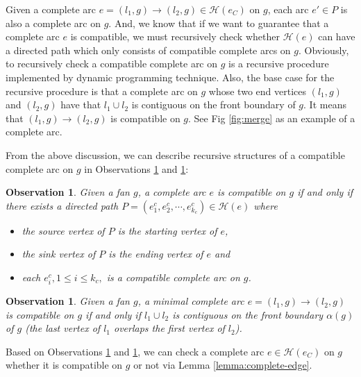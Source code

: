 \documentclass[11pt]{article}
\newcommand{\HH}{\mathcal{H}}
\newtheorem{observation}[figure]{Observation}
\begin{document}
Given a complete arc $e=(l_1, g)\rightarrow (l_2, g)\in \HH(e_C)$ on $g$,
each arc $e'\in P$ is also a complete arc on $g$.
And, we know that if we want to guarantee that a complete arc $e$ is compatible, we
must recursively check whether $\HH(e)$ can have a directed path which only consists of
compatible complete arcs on $g$.
Obviously, to recursively check a compatible complete arc on $g$
is a recursive procedure implemented by dynamic programming technique.
Also, the base case for the recursive procedure
is that a complete arc on $g$ whose two end vertices $(l_1, g)$ and $(l_2, g)$
have that $l_1\cup l_2$ is contiguous on the front boundary of $g$. It means that
$(l_1, g) \rightarrow (l_2, g)$ is compatible on $g$.
See Fig \ref{fig:merge} as an example of a complete arc.

From the above discussion, we can describe recursive structures of a compatible
complete arc on $g$ in Observations \ref{obs:complete-edge} and \ref{obs:minimal-complete-edge}:





\begin{observation}\label{obs:complete-edge}
Given a fan $g$, a complete arc
$e$ is compatible on $g$ if and only if
there exists a directed path $P=(e^c_1, e^c_2, \cdots, e^c_{k_c}) \in \HH(e)$
where
\begin{itemize}
\item the source vertex of $P$ is the starting vertex of $e$,
\item the sink vertex of $P$ is the ending vertex of $e$ and
\item each $e^c_i, 1\leq i\leq k_c,$ is a compatible complete arc on $g$.
\end{itemize}
\end{observation}

\begin{observation}\label{obs:minimal-complete-edge}
Given a fan $g$,
a minimal complete arc $e=(l_1, g)\rightarrow (l_2, g)$ is compatible on $g$
if and only if
$l_1\cup l_2$ is contiguous on the front boundary $\alpha(g)$ of $g$
(the last vertex of $l_1$ overlaps the first vertex of $l_2$).
\end{observation}


Based on Observations \ref{obs:complete-edge} and \ref{obs:minimal-complete-edge},
we can check a complete arc $e \in \HH(e_C)$ on $g$ whether it is compatible
on $g$ or not via Lemma \ref{lemma:complete-edge}.
\end{document}
